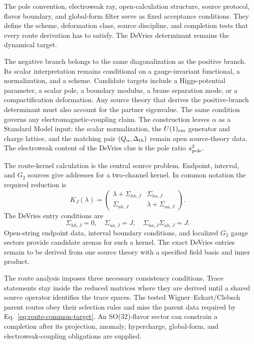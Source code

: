 The pole convention, electroweak ray, open-calculation structure, source
protocol, flavor boundary, and global-form filter serve as fixed acceptance
conditions.  They define the scheme, deformation class, source discipline, and
completion tests that every route derivation has to satisfy.
The DeVries determinant remains the dynamical target.

The negative branch belongs to the same diagonalization as the positive branch.
Its scalar interpretation remains conditional on a gauge-invariant functional,
a normalization, and a scheme.  Candidate targets include a Higgs-potential
parameter, a scalar pole, a boundary modulus, a brane separation mode, or a
compactification deformation.  Any source theory that derives the
positive-branch determinant must also account for the partner eigenvalue.
The same condition governs any electromagnetic-coupling claim.  The
construction leaves \(\alpha\) as a Standard Model input: the scalar
normalization, the \(U(1)_{\rm em}\) generator and charge lattice, and the
matching pair \((Q_\alpha,\Delta_{\rm th})\) remain open source-theory data.
The electroweak content of the DeVries clue is the pole ratio \(s^2_{\rm pole}\).

The route-kernel calculation is the central source problem.  Endpoint,
interval, and \(G_2\) sources give addresses for a two-channel kernel.  In
common notation the required reduction is
\[
  K_J(\lambda)=
  \begin{pmatrix}
  \lambda+\Sigma_{hh,J} & \Sigma_{ha,J}\\
  \Sigma_{ah,J} & \lambda+\Sigma_{aa,J}
  \end{pmatrix}.
\]
The DeVries entry conditions are
\[
  \Sigma_{hh,J}=0,\quad
  \Sigma_{aa,J}=J,\quad
  \Sigma_{ha,J}\Sigma_{ah,J}=J .
\]
Open-string endpoint data, interval boundary conditions, and localized
\(G_2\) gauge sectors provide candidate arenas for such a kernel.  The
exact DeVries entries remain to be derived from one source theory with a
specified field basis and inner product.

The route analysis imposes three necessary consistency conditions.  Trace
statements stay inside the reduced matrices where they are derived until a
shared source operator identifies the trace spaces.  The tested
Wigner--Eckart/Clebsch parent routes obey their selection rules and miss the
parent data required by Eq.~\eqref{eq:route-common-target}.  An SO(32)-flavor
sector can constrain a completion after its projection, anomaly, hypercharge,
global-form, and electroweak-coupling obligations are supplied.

